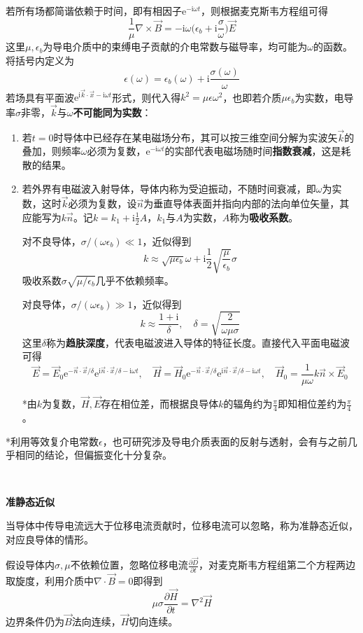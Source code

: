 \documentclass[a4paper,UTF8,fontset=windows]{ctexart}
\newcommand*{\er}{\mathrm{e}}
\newcommand*{\ir}{\mathrm{i}}
\newcommand*{\vb}{\vec{B}}
\newcommand*{\vd}{\vec{D}}
\newcommand*{\ve}{\vec{E}}
\newcommand*{\vh}{\vec{H}}
\newcommand*{\vks}{\vec{k}}
\newcommand*{\vns}{\vec{n}}
\newcommand*{\vx}{\vec{x}}
\newcommand*{\pt}[2][t]{\frac{\partial #2}{\partial #1}}
\begin{document}
\

若所有场都简谐依赖于时间，即有相因子$\er^{-\ir\omega t}$，则根据麦克斯韦方程组可得
$$\frac{1}{\mu}\nabla\times\vb=-\ir\omega\bigg(\epsilon_b+\ir\frac{\sigma}{\omega}\bigg)\ve$$
这里$\mu,\epsilon_b$为导电介质中的束缚电子贡献的介电常数与磁导率，均可能为$\omega$的函数。将括号内定义为
$$\epsilon(\omega)=\epsilon_b(\omega)+\ir\frac{\sigma(\omega)}{\omega}$$
若场具有平面波$\er^{\ir\vks\cdot\vx-\ir\omega t}$形式，则代入得$k^2=\mu\epsilon\omega^2$，也即若介质$\mu\epsilon_b$为实数，电导率$\sigma$非零，$\vks$与$\omega$\textbf{不可能同为实数}：
\begin{enumerate}
    \item 若$t=0$时导体中已经存在某电磁场分布，其可以按三维空间分解为实波矢$\vks$的叠加，则频率$\omega$必须为复数，$\er^{-\ir\omega t}$的实部代表电磁场随时间\textbf{指数衰减}，这是耗散的结果。
    \item 若外界有电磁波入射导体，导体内称为受迫振动，不随时间衰减，即$\omega$为实数，这时$\vks$必须为复数，设$\vns$为垂直导体表面并指向内部的法向单位矢量，其应能写为$k\vns$。记$k=k_1+\ir\frac{1}{2}A$，$k_1$与$A$为实数，$A$称为\textbf{吸收系数}。
    
    对不良导体，$\sigma/(\omega\epsilon_b)\ll1$，近似得到
    $$k\approx\sqrt{\mu\epsilon_b}\omega+\ir\frac{1}{2}\sqrt{\frac{\mu}{\epsilon_b}}\sigma$$
    吸收系数$\sigma\sqrt{\mu/\epsilon_b}$几乎不依赖频率。

    对良导体，$\sigma/(\omega\epsilon_b)\gg1$，近似得到
    $$k\approx\frac{1+\ir}{\delta},\quad\delta=\sqrt{\frac{2}{\omega\mu\sigma}}$$
    这里$\delta$称为\textbf{趋肤深度}，代表电磁波进入导体的特征长度。直接代入平面电磁波可得
    $$\ve=\ve_0\er^{-\vns\cdot\vx/\delta}\er^{\ir\vns\cdot\vx/\delta-\ir\omega t},\quad\vh=\vh_0\er^{-\vns\cdot\vx/\delta}\er^{\ir\vns\cdot\vx/\delta-\ir\omega t},\quad\vh_0=\frac{1}{\mu\omega}k\vns\times\ve_0$$

    *由$k$为复数，$\vh,\ve$存在相位差，而根据良导体$k$的辐角约为$\frac{\pi}{4}$即知相位差约为$\frac{\pi}{4}$。
\end{enumerate}

*利用等效复介电常数$\epsilon$，也可研究涉及导电介质表面的反射与透射，会有与之前几乎相同的结论，但偏振变化十分复杂。

\

\textbf{准静态近似}

当导体中传导电流远大于位移电流贡献时，位移电流可以忽略，称为准静态近似，对应良导体的情形。

假设导体内$\sigma,\mu$不依赖位置，忽略位移电流$\pt{\vd}$，对麦克斯韦方程组第二个方程两边取旋度，利用介质中$\nabla\cdot\vb=0$即得到
$$\mu\sigma\pt{\vh}=\nabla^2\vh$$
边界条件仍为$\vb$法向连续，$\vh$切向连续。
\end{document}
